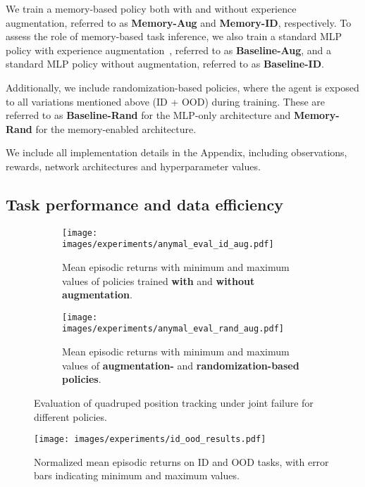 We train a memory-based policy both with and without experience augmentation, referred to as \textbf{Memory-Aug} and \textbf{Memory-ID}, respectively. 
To assess the role of memory-based task inference, we also train a standard MLP policy with experience augmentation~\citep{Mittal2024SymmetryCF, Su2024LeveragingSym}, referred to as \textbf{Baseline-Aug}, and a standard MLP policy without augmentation, referred to as \textbf{Baseline-ID}.

Additionally, we include randomization-based policies, where the agent is exposed to all variations mentioned above (ID + OOD) during training. 
These are referred to as \textbf{Baseline-Rand} for the MLP-only architecture and  \textbf{Memory-Rand} for the memory-enabled architecture.

We include all implementation details in the Appendix, including observations, rewards, network architectures and hyperparameter values.

\subsection{Task performance and data efficiency}
\begin{figure}
\centering
    \begin{subfigure}[b]{1.0\linewidth} %
        \centering
        \texttt{[image: images/experiments/anymal\_eval\_id\_aug.pdf]}
        \caption{Mean episodic returns with minimum and maximum values of policies trained \textbf{with} and \textbf{without augmentation}.}
        \label{fig:anymal_pos_tracking_joint_id_aug}
    \end{subfigure}

    \begin{subfigure}[b]{1.0\linewidth}
        \centering
        \texttt{[image: images/experiments/anymal\_eval\_rand\_aug.pdf]}
        \caption{Mean episodic returns with minimum and maximum values of \textbf{augmentation-} and \textbf{randomization-based policies}.}
        \label{fig:anymal_pos_tracking_joint_rand_aug}
    \end{subfigure}

\caption{Evaluation of quadruped position tracking under joint failure for different policies.}
\label{fig:anymal_pos_joint_eval}
\end{figure}

\begin{figure*}
\centering
\texttt{[image: images/experiments/id\_ood\_results.pdf]}
\caption{Normalized mean episodic returns on ID and OOD tasks, with error
bars indicating minimum and maximum values.}
\label{fig:all_exp_results}
\end{figure*}

